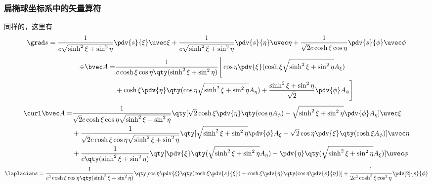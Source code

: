\subsubsection{扁椭球坐标系中的矢量算符}
同样的，这里有
\begin{equation}
\grad s = \frac{1}{c\sqrt{\sinh^2\xi+\sin^2\eta}} \pdv{s}{\xi}\uvec \xi + \frac{1}{c\sqrt{\sinh^2\xi+\sin^2\eta}}\pdv{s}{\eta} \uvec \eta +  \frac{1}{\sqrt{2}c\cosh\xi\cos\eta}\pdv{s}{\phi}\uvec \phi
\end{equation}
\begin{equation}
\begin{aligned}
\div \bvec A = &\frac{1}{c\cosh\xi\cos\eta\qty(\sinh^2\xi+\sin^2\eta)}\Bigg[\cos\eta\pdv{\xi}(\cosh\xi\sqrt{\sinh^2\xi+\sin^2\eta}A_\xi) \\&+ \cosh\xi\pdv{\eta}\qty(\cos\eta\sqrt{\sinh^2\xi+\sin^2\eta}A_\eta) + \frac{\sinh^2\xi+\sin^2\eta}{\sqrt{2}}\pdv{\phi}A_\phi\Bigg]
\end{aligned}
\end{equation}
\begin{equation}
\begin{aligned}
\curl \bvec A =& \frac{1}{\sqrt{2}c\cosh\xi\cos\eta\sqrt{\sinh^2\xi+\sin^2\eta}}\qty[\sqrt{2}\cosh\xi\pdv{\eta}\qty(\cos\eta
A_\phi) - \sqrt{\sinh^2\xi+\sin^2\eta}\pdv{\phi}A_\eta]\uvec \xi\\
&+ \frac{1}{\sqrt{2}c\cosh\xi\cos\eta\sqrt{\sinh^2\xi+\sin^2\eta}}\qty[\sqrt{\sinh^2\xi+\sin^2\eta}\pdv{\phi}A_\xi - \sqrt{2}\cos\eta\pdv{\xi}\qty(\cosh\xi
A_\phi)]\uvec \eta
 \\
&+\frac{1}{c\qty(\sinh^2\xi+\sin^2\eta)}\qty[\pdv{\xi}\qty(\sqrt{\sinh^2\xi+\sin^2\eta}A_\eta) - \pdv{\eta}\qty(\sqrt{\sinh^2\xi+\sin^2\eta}A_\xi)]\uvec \phi
\end{aligned}
\end{equation}
\begin{equation}
\laplacian s = \frac{1}{c^2\cosh\xi\cos\eta\qty(\sinh^2\xi+\sin^2\eta)}\qty[\cos\eta\pdv{\xi}\qty(\cosh\xi\pdv{s}{\xi}) + \cosh\xi\pdv{\eta}\qty(\cos\eta\pdv{s}{\eta})]+ \frac{1}{2c^2\cosh^2\xi\cos^2\eta }\pdv[2]{s}{\phi}
\end{equation}
